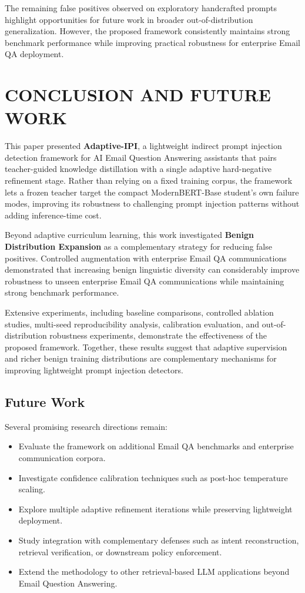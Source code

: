 \documentclass[conference]{IEEEtran}
\begin{document}
The remaining false positives observed on exploratory handcrafted prompts highlight opportunities for future work in broader out-of-distribution generalization. However, the proposed framework consistently maintains strong benchmark performance while improving practical robustness for enterprise Email QA deployment.

\section{CONCLUSION AND FUTURE WORK}

This paper presented \textbf{Adaptive-IPI}, a lightweight indirect prompt injection detection framework for AI Email Question Answering assistants that pairs teacher-guided knowledge distillation with a single adaptive hard-negative refinement stage. Rather than relying on a fixed training corpus, the framework lets a frozen teacher target the compact ModernBERT-Base student's own failure modes, improving its robustness to challenging prompt injection patterns without adding inference-time cost.

Beyond adaptive curriculum learning, this work investigated \textbf{Benign Distribution Expansion} as a complementary strategy for reducing false positives. Controlled augmentation with enterprise Email QA communications demonstrated that increasing benign linguistic diversity can considerably improve robustness to unseen enterprise Email QA communications while maintaining strong benchmark performance.

Extensive experiments, including baseline comparisons, controlled ablation studies, multi-seed reproducibility analysis, calibration evaluation, and out-of-distribution robustness experiments, demonstrate the effectiveness of the proposed framework. Together, these results suggest that adaptive supervision and richer benign training distributions are complementary mechanisms for improving lightweight prompt injection detectors.

\subsection{Future Work}

Several promising research directions remain:
\begin{itemize}
    \item Evaluate the framework on additional Email QA benchmarks and enterprise communication corpora.
    \item Investigate confidence calibration techniques such as post-hoc temperature scaling.
    \item Explore multiple adaptive refinement iterations while preserving lightweight deployment.
    \item Study integration with complementary defenses such as intent reconstruction, retrieval verification, or downstream policy enforcement.
    \item Extend the methodology to other retrieval-based LLM applications beyond Email Question Answering.
\end{itemize}
\end{document}
